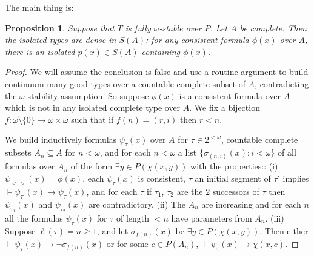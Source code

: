 \documentclass[12pt]{article}
\newtheorem{Proposition}[Theorem]{Proposition}
\begin{document}
The main thing is: 
\begin{Proposition} Suppose that $T$ is fully $\omega$-stable over $P$. Let $A$ be complete. Then the isolated types are dense in $S(A)$: for any consistent formula $\phi(x)$ over $A$, there is an isolated $p(x)\in S(A)$ containing $\phi(x)$.
\end{Proposition}
\begin{proof} We will assume the conclusion is false and use a routine argument to build continuum many good types over a countable complete subset of $A$, contradicting the $\omega$-stability assumption. 
So suppose $\phi(x)$ is a consistent formula over $A$ which is not in any isolated complete type over $A$.  We fix a bijection $f: \omega\setminus \{0\} \to \omega\times \omega$ such that if $f(n) = (r,i)$ then $r < n$. 

We build inductively formulas  $\psi_{\tau}(x)$ over $A$ for $\tau\in 2^{<\omega}$, countable complete subsets $A_{n}\subseteq A$ for $n<\omega$, and for each $n<\omega$ a list $\{\sigma_{(n,i)}(x): i<\omega\}$ of all formulas over $A_{n}$ of the form $\exists y \in P(\chi(x,y))$ with the properties::
\newline
(i)  $\psi_{<>}(x) = \phi(x)$, each $\psi_{\tau}(x)$ is consistent,   $\tau$ an initial segment of $\tau'$ implies $\models \psi_{\tau '}(x) \to \psi_{\tau}(x)$, and for each $\tau$ if $\tau_{1}$, $\tau_{2}$ are the $2$ successors of $\tau$ then $\psi_{\tau_{1}}(x)$ and $\psi_{\tau_{2}}(x)$ are contradictory,
\newline
(ii)  The $A_{n}$ are increasing and for each $n$ all the formulas $\psi_{\tau}(x)$ for $\tau$ of length $< n$  have parameters from $A_{n}$.
\newline
(iii)  Suppose $\ell(\tau) = n\geq 1$, and let $\sigma_{f(n)}(x)$ be $\exists y\in P (\chi(x,y))$. Then either $\models \psi_{\tau}(x) \to \neg\sigma_{f(n)}(x)$ or for some $c\in P(A_{n})$, $\models \psi_{\tau}(x) \to \chi(x,c)$. 


\end{proof}
\end{document}
